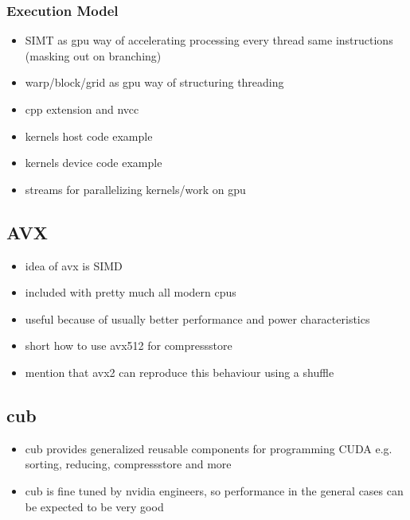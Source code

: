 \documentclass{tudscrartcl}
\begin{document}
			\subsubsection{Execution Model}
				\begin{itemize}
					\item SIMT as gpu way of accelerating processing
						\subitem every thread same instructions (masking out on branching)
					\item warp/block/grid as gpu way of structuring threading
					\item cpp extension and nvcc
					\item kernels host code example
					\item kernels device code example
					\item streams for parallelizing kernels/work on gpu
				\end{itemize}
			
		\subsection{AVX}
			\begin{itemize}
				\item idea of avx is SIMD
				\item included with pretty much all modern cpus
				\item useful because of usually better performance and power characteristics
				\item short how to use avx512 for compressstore
				\item mention that avx2 can reproduce this behaviour using a shuffle
			\end{itemize}
		
		\subsection{cub}
			\begin{itemize}
				\item cub provides generalized reusable components for programming CUDA
					\subitem e.g. sorting, reducing, compressstore and more
				\item cub is fine tuned by nvidia engineers, so performance in the general cases can be expected to be very good
			\end{itemize}
		
\end{document}
